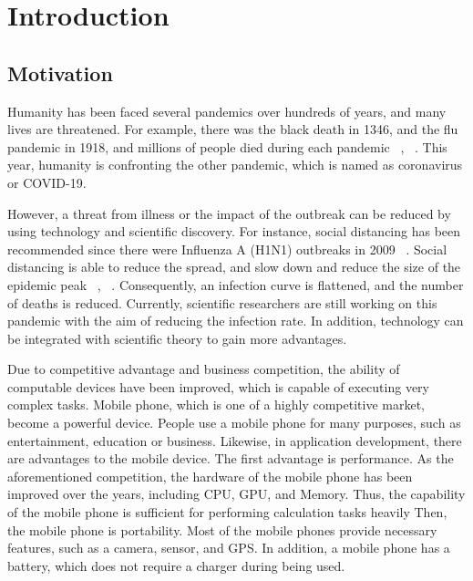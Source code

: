\chapter{Introduction}\label{intro}
    \section{Motivation}

        Humanity has been faced several pandemics over hundreds of years, and many lives are threatened.
        For example, there was the black death in 1346, and the flu pandemic in 1918, and millions of people died during each pandemic ~\cite{REF1-02}, ~\cite{REF1-01}.
        This year, humanity is confronting the other pandemic, which is named as coronavirus or COVID-19.

        However, a threat from illness or the impact of the outbreak can be reduced by using technology and scientific discovery.
        For instance, social distancing has been recommended since there were Influenza A (H1N1) outbreaks in 2009 ~\cite{REF1-05}.
        Social distancing is able to reduce the spread, and slow down and reduce the size of the epidemic peak ~\cite{REF1-03}, ~\cite{REF1-04}.
        Consequently, an infection curve is flattened, and the number of deaths is reduced.
        Currently, scientific researchers are still working on this pandemic with the aim of reducing the infection rate.
        In addition, technology can be integrated with scientific theory to gain more advantages.

        Due to competitive advantage and business competition, the ability of computable devices have been improved, which is capable of executing very complex tasks.
        Mobile phone, which is one of a highly competitive market, become a powerful device.
        People use a mobile phone for many purposes, such as entertainment, education or business.
        Likewise, in application development, there are advantages to the mobile device.
        The first advantage is performance.
            As the aforementioned competition, the hardware of the mobile phone has been improved over the years, including CPU, GPU, and Memory.
            Thus, the capability of the mobile phone is sufficient for performing calculation tasks heavily
        Then, the mobile phone is portability.
            Most of the mobile phones provide necessary features, such as a camera, sensor, and GPS.
            In addition, a mobile phone has a battery, which does not require a charger during being used.

